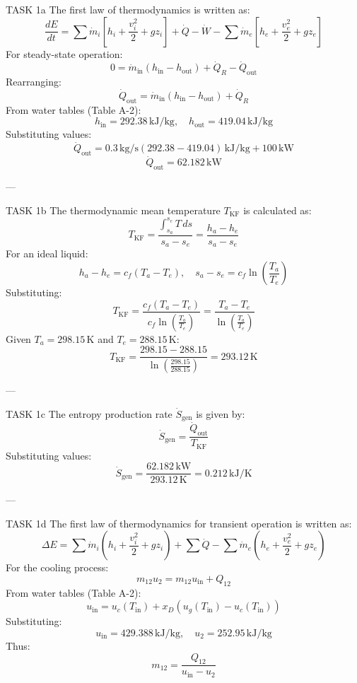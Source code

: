 TASK 1a  
The first law of thermodynamics is written as:  
\[
\frac{dE}{dt} = \sum \dot{m}_i \left[ h_i + \frac{v_i^2}{2} + g z_i \right] + \dot{Q} - \dot{W} - \sum \dot{m}_e \left[ h_e + \frac{v_e^2}{2} + g z_e \right]
\]  
For steady-state operation:  
\[
0 = \dot{m}_{\text{in}} \left( h_{\text{in}} - h_{\text{out}} \right) + \dot{Q}_R - \dot{Q}_{\text{out}}
\]  
Rearranging:  
\[
\dot{Q}_{\text{out}} = \dot{m}_{\text{in}} \left( h_{\text{in}} - h_{\text{out}} \right) + \dot{Q}_R
\]  
From water tables (Table A-2):  
\[
h_{\text{in}} = 292.38 \, \text{kJ/kg}, \quad h_{\text{out}} = 419.04 \, \text{kJ/kg}
\]  
Substituting values:  
\[
\dot{Q}_{\text{out}} = 0.3 \, \text{kg/s} \left( 292.38 - 419.04 \right) \, \text{kJ/kg} + 100 \, \text{kW}
\]  
\[
\dot{Q}_{\text{out}} = 62.182 \, \text{kW}
\]  

---

TASK 1b  
The thermodynamic mean temperature \( T_{\text{KF}} \) is calculated as:  
\[
T_{\text{KF}} = \frac{\int_{s_a}^{s_e} T \, ds}{s_a - s_e} = \frac{h_a - h_e}{s_a - s_e}
\]  
For an ideal liquid:  
\[
h_a - h_e = c_f \left( T_a - T_e \right), \quad s_a - s_e = c_f \ln \left( \frac{T_a}{T_e} \right)
\]  
Substituting:  
\[
T_{\text{KF}} = \frac{c_f \left( T_a - T_e \right)}{c_f \ln \left( \frac{T_a}{T_e} \right)} = \frac{T_a - T_e}{\ln \left( \frac{T_a}{T_e} \right)}
\]  
Given \( T_a = 298.15 \, \text{K} \) and \( T_e = 288.15 \, \text{K} \):  
\[
T_{\text{KF}} = \frac{298.15 - 288.15}{\ln \left( \frac{298.15}{288.15} \right)} = 293.12 \, \text{K}
\]  

---

TASK 1c  
The entropy production rate \( \dot{S}_{\text{gen}} \) is given by:  
\[
\dot{S}_{\text{gen}} = \frac{\dot{Q}_{\text{out}}}{T_{\text{KF}}}
\]  
Substituting values:  
\[
\dot{S}_{\text{gen}} = \frac{62.182 \, \text{kW}}{293.12 \, \text{K}} = 0.212 \, \text{kJ/K}
\]  

---

TASK 1d  
The first law of thermodynamics for transient operation is written as:  
\[
\Delta E = \sum \dot{m}_i \left( h_i + \frac{v_i^2}{2} + g z_i \right) + \sum \dot{Q} - \sum \dot{m}_e \left( h_e + \frac{v_e^2}{2} + g z_e \right)
\]  
For the cooling process:  
\[
m_{12} u_2 = m_{12} u_{\text{in}} + Q_{12}
\]  
From water tables (Table A-2):  
\[
u_{\text{in}} = u_c \left( T_{\text{in}} \right) + x_D \left( u_g \left( T_{\text{in}} \right) - u_c \left( T_{\text{in}} \right) \right)
\]  
Substituting:  
\[
u_{\text{in}} = 429.388 \, \text{kJ/kg}, \quad u_2 = 252.95 \, \text{kJ/kg}
\]  
Thus:  
\[
m_{12} = \frac{Q_{12}}{u_{\text{in}} - u_2}
\]